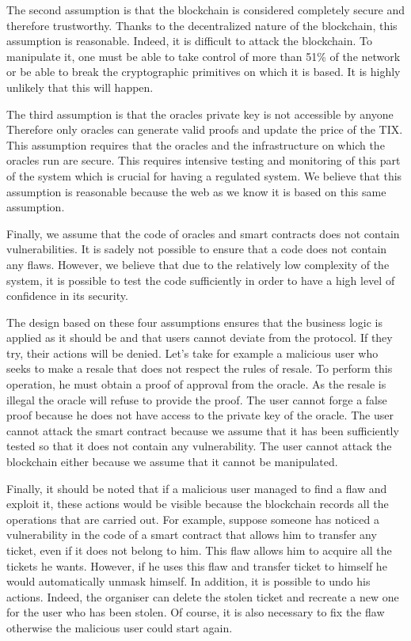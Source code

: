 \documentclass[a4paper,11pt,oneside]{report}
\begin{document}
The second assumption is that the blockchain is considered completely secure and therefore trustworthy. Thanks to the decentralized nature of the blockchain, this assumption is reasonable. Indeed, it is difficult to attack the blockchain. To manipulate it, one must be able to take control of more than 51\% of the network or be able to break the cryptographic primitives on which it is based. It is highly unlikely that this will happen.

The third assumption is that the oracles private key is not accessible by anyone Therefore only oracles can generate valid proofs and update the price of the TIX. This assumption requires that the oracles and the infrastructure on which the oracles run are secure. This requires intensive testing and monitoring of this part of the system which is crucial for having a regulated system. We believe that this assumption is reasonable because the web as we know it is based on this same assumption.

Finally, we assume that the code of oracles and smart contracts does not contain vulnerabilities. It is sadely not possible to ensure that a code does not contain any flaws. However, we believe that due to the relatively low complexity of the system, it is possible to test the code sufficiently in order to have a high level of confidence in its security.

The design based on these four assumptions ensures that the business logic is applied as it should be and that users cannot deviate from the protocol. If they try, their actions will be denied. Let's take for example a malicious user who seeks to make a resale that does not respect the rules of resale. To perform this operation, he must obtain a proof of approval from the oracle. As the resale is illegal the oracle will refuse to provide the proof. The user cannot forge a false proof because he does not have access to the private key of the oracle. The user cannot attack the smart contract because we assume that it has been sufficiently tested so that it does not contain any vulnerability. The user cannot attack the blockchain either because we assume that it cannot be manipulated.

Finally, it should be noted that if a malicious user managed to find a flaw and exploit it, these actions would be visible because the blockchain records all the operations that are carried out. For example, suppose someone has noticed a vulnerability in the code of a smart contract that allows him to transfer any ticket, even if it does not belong to him. This flaw allows him to acquire all the tickets he wants. However, if he uses this flaw and transfer ticket to himself he would automatically unmask himself. In addition, it is possible to undo his actions. Indeed, the organiser can delete the stolen ticket and recreate a new one for the user who has been stolen. Of course, it is also necessary to fix the flaw otherwise the malicious user could start again.
\end{document}
